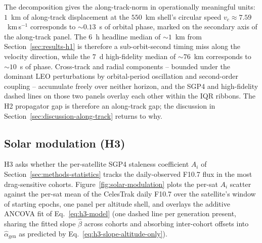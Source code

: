 \documentclass[10pt, letterpaper]{article}
\begin{document}
The decomposition gives the
along-track-norm in operationally meaningful units:
$1$~km of along-track displacement at the $550$~km shell's circular
speed $v_{c} \approx 7.59$~km\,s$^{-1}$ corresponds to
$\sim 0.13$~s of orbital phase, marked on the secondary axis of the
along-track panel. The $6$~h headline median of $\sim 1$~km from
Section~\ref{sec:results-h1} is therefore a sub-orbit-second timing
miss along the velocity direction, while the $7$~d high-fidelity
median of $\sim 76$~km corresponds to $\sim 10$~s of phase.
Cross-track and radial components -- bounded under the dominant LEO
perturbations by orbital-period oscillation and second-order coupling
\citep[\S\,3.4]{vallado2013} -- accumulate freely over neither
horizon, and the SGP4 and high-fidelity dashed lines on those two
panels overlay each other within the IQR ribbons. The H2 propagator
gap is therefore an along-track gap; the discussion in
Section~\ref{sec:discussion-along-track} returns to why.

\subsection{Solar modulation (H3)}
\label{sec:results-h3}

H3 asks whether the per-satellite SGP4 staleness coefficient $A_{i}$
of Section~\ref{sec:methods-statistics} tracks the daily-observed
F10.7 flux in the most drag-sensitive cohorts.
Figure~\ref{fig:solar-modulation} plots the per-sat $A_{i}$ scatter
against the per-sat mean of the CelesTrak daily F10.7 over the
satellite's window of starting epochs, one panel per altitude shell,
and overlays the additive ANCOVA fit of Eq.~\eqref{eq:h3-model}
(one dashed line per generation present, sharing the fitted slope
$\hat\beta$ across cohorts and absorbing inter-cohort offsets into
$\hat\alpha_{\mathrm{gen}}$ as predicted by
Eq.~\eqref{eq:h3-slope-altitude-only}).
\end{document}
